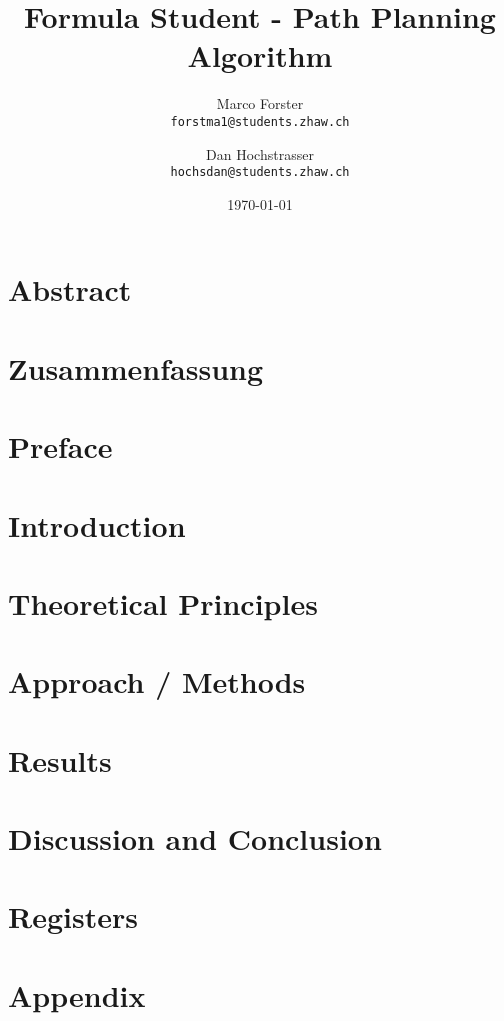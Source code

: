 \documentclass[a4paper, 12pt]{report}
\title{Formula Student - Path Planning Algorithm}
\author{
  Marco Forster\\
  \texttt{forstma1@students.zhaw.ch}
  \and
  Dan Hochstrasser\\
  \texttt{hochsdan@students.zhaw.ch}
}
\date{\today}
\begin{document}
\begin{sloppypar}





\chapter*{Abstract}


\chapter*{Zusammenfassung}


\chapter*{Preface}


\tableofcontents

\chapter{Introduction}


\chapter{Theoretical Principles}


\chapter{Approach / Methods}


\chapter{Results}


\chapter{Discussion and Conclusion}


\chapter{Registers}


\appendix
\chapter{Appendix}


\end{sloppypar}
\end{document}
